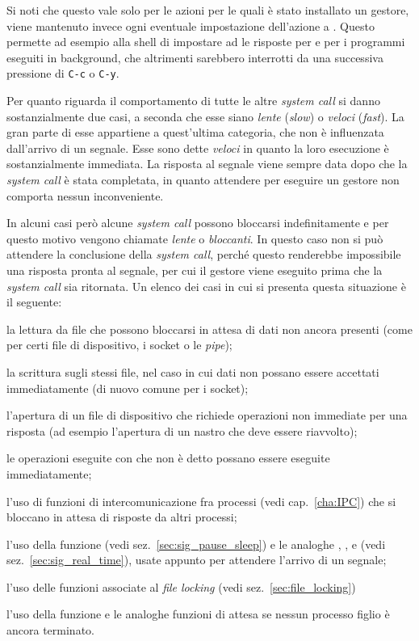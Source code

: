 Si noti che questo vale solo per le azioni per le quali è stato installato un
gestore, viene mantenuto invece ogni eventuale impostazione dell'azione a
. Questo permette ad esempio alla shell di impostare ad
 le risposte per  e  per i
programmi eseguiti in background, che altrimenti sarebbero interrotti da una
successiva pressione di \texttt{C-c} o \texttt{C-y}.

Per quanto riguarda il comportamento di tutte le altre \textit{system call} si
danno sostanzialmente due casi, a seconda che esse siano \textsl{lente}
(\textit{slow}) o \textsl{veloci} (\textit{fast}). La gran parte di esse
appartiene a quest'ultima categoria, che non è influenzata dall'arrivo di un
segnale. Esse sono dette \textsl{veloci} in quanto la loro esecuzione è
sostanzialmente immediata. La risposta al segnale viene sempre data dopo che
la \textit{system call} è stata completata, in quanto attendere per eseguire
un gestore non comporta nessun inconveniente.


In alcuni casi però alcune \textit{system call} possono bloccarsi
indefinitamente e per questo motivo vengono chiamate \textsl{lente} o
\textsl{bloccanti}. In questo caso non si può attendere la conclusione della
\textit{system call}, perché questo renderebbe impossibile una risposta pronta
al segnale, per cui il gestore viene eseguito prima che la \textit{system
  call} sia ritornata.  Un elenco dei casi in cui si presenta questa
situazione è il seguente:
\begin{itemize*}
\item la lettura da file che possono bloccarsi in attesa di dati non ancora
  presenti (come per certi file di dispositivo, i socket o le \textit{pipe});
\item la scrittura sugli stessi file, nel caso in cui dati non possano essere
  accettati immediatamente (di nuovo comune per i socket);
\item l'apertura di un file di dispositivo che richiede operazioni non
  immediate per una risposta (ad esempio l'apertura di un nastro che deve
  essere riavvolto);
\item le operazioni eseguite con  che non è detto possano essere
  eseguite immediatamente;
\item l'uso di funzioni di intercomunicazione fra processi (vedi
  cap.~\ref{cha:IPC}) che si bloccano in attesa di risposte da altri processi;
\item l'uso della funzione  (vedi sez.~\ref{sec:sig_pause_sleep})
  e le analoghe , , e 
  (vedi sez.~\ref{sec:sig_real_time}), usate appunto per attendere l'arrivo di
  un segnale;
\item l'uso delle funzioni associate al \textit{file locking} (vedi
  sez.~\ref{sec:file_locking})
\item l'uso della funzione  e le analoghe funzioni di attesa se
  nessun processo figlio è ancora terminato.
\end{itemize*}

